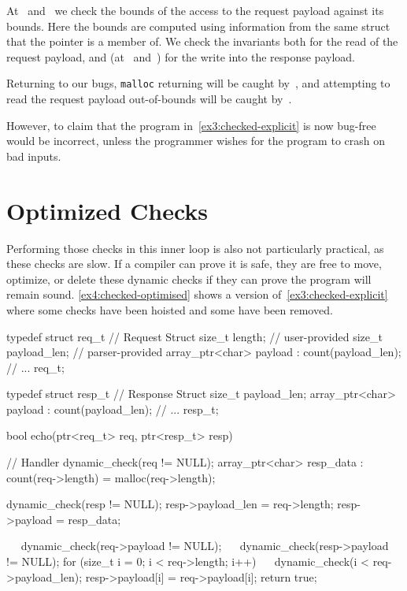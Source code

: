 At~ and~ we check the bounds
of the access to the request payload against its bounds. Here the
bounds are computed using information from the same struct that the
pointer is a member of. We check the invariants both for the read of
the request payload, and (at~
and~) for the write into the response payload.

Returning to our bugs, \lstinline|malloc| returning \NULL{} will be
caught by~, and attempting to read the request
payload out-of-bounds will be caught by~.

However, to claim that the program in~\autoref{ex3:checked-explicit}
is now bug-free would be incorrect, unless the programmer wishes for
the program to crash on bad inputs.

\section{Optimized Checks}

Performing those checks in this inner loop is also not particularly
practical, as these checks are slow. If a compiler can prove it is
safe, they are free to move, optimize, or delete these dynamic checks
if they can prove the program will remain sound.
\autoref{ex4:checked-optimised} shows a version
of~\autoref{ex3:checked-explicit} where some checks have been hoisted
and some have been removed.


\begin{code}[label=ex4:checked-optimised,float=t,caption={Optimised Checked Example with Explicit Checks (Based on \autoref{ex3:checked-explicit})}]
typedef struct req_t {  // Request Struct
  size_t length;         // user-provided
  size_t payload_len;    // parser-provided
  array_ptr<char> payload : count(payload_len);
  // ...
} req_t;

typedef struct resp_t {  // Response Struct
  size_t payload_len;
  array_ptr<char> payload : count(payload_len);
  // ...
} resp_t;

bool echo(ptr<req_t> req, ptr<resp_t> resp) {  // Handler
  dynamic_check(req != NULL);
  array_ptr<char> resp_data : count(req->length) = malloc(req->length);

  dynamic_check(resp != NULL);
  resp->payload_len = req->length;
  resp->payload     = resp_data;

~~  dynamic_check(req->payload != NULL);
~~  dynamic_check(resp->payload != NULL);
  for (size_t i = 0; i < req->length; i++) {
~~    dynamic_check(i < req->payload_len);
    resp->payload[i] = req->payload[i];
  }
  return true;
}
\end{code}

